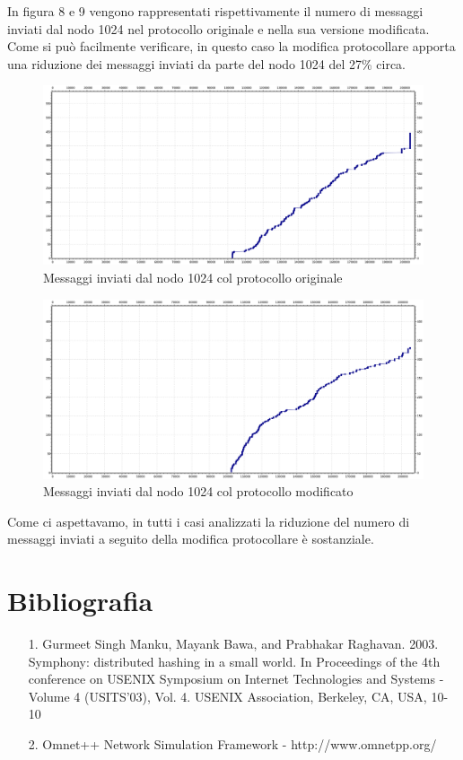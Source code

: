 \documentclass[	
	DIV=calc,
	paper=a4,
	fontsize=11pt,
	onecolumn
]{scrartcl} %
\begin{document}
In figura 8 e 9 vengono rappresentati rispettivamente il numero di messaggi inviati dal nodo 1024 nel protocollo originale e nella sua versione modificata. Come si può facilmente verificare, in questo caso la modifica protocollare apporta una riduzione dei messaggi inviati da parte del nodo 1024 del 27\% circa.

\begin{figure}[H]
	\centering
	\includegraphics[scale=0.35]{TwoThousandNodesNode1024.png}
	\caption{Messaggi inviati dal nodo 1024 col protocollo originale}
	\label{Figura 8}
\end{figure}

\begin{figure}[H]
	\centering
	\includegraphics[scale=0.35]{TwoThousandNodesNode1024Mod.png}
	\caption{Messaggi inviati dal nodo 1024 col protocollo modificato}
	\label{Figura 9}
\end{figure}

Come ci aspettavamo, in tutti i casi analizzati la riduzione del numero di messaggi inviati a seguito della modifica protocollare è sostanziale. 
\section{Bibliografia}
\begin{itemize}
\item[1.] Gurmeet Singh Manku, Mayank Bawa, and Prabhakar Raghavan. 2003. Symphony: distributed
hashing in a small world. In Proceedings of the 4th conference on USENIX Symposium on
Internet Technologies and Systems - Volume 4 (USITS'03), Vol. 4. USENIX Association,
Berkeley, CA, USA, 10-10
\item[2.] Omnet++ Network Simulation Framework - http://www.omnetpp.org/ 
\end{itemize}
\end{document}
